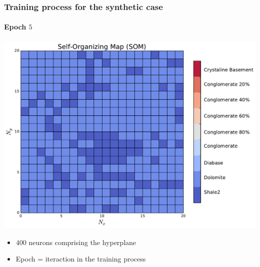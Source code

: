 \documentclass[aspectratio=10]{beamer} %
\begin{document}
%			
%			

\begin{frame}
\frametitle{Training process for the synthetic case}
\framesubtitle{Epoch $5$}
\centering
\includegraphics[scale=0.3]{Imagens/SOM5.pdf} 
\pause
\begin{itemize}
	\footnotesize
	\item $400$ neurons comprising the hyperplane
	\pause
	\item Epoch = iteraction in the training process
\end{itemize}
\end{frame}
\end{document}
